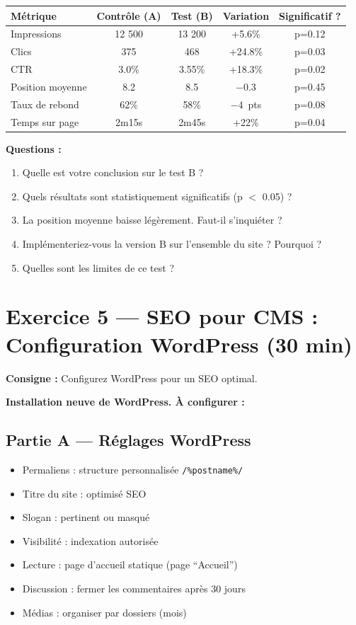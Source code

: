 \documentclass[12pt,a4paper]{report}
\begin{document}
\begin{longtable}{|l|c|c|c|c|}
\hline
\textbf{Métrique} & \textbf{Contrôle (A)} & \textbf{Test (B)} & \textbf{Variation} & \textbf{Significatif ?} \\
\hline
Impressions & 12 500 & 13 200 & +5.6\% & p=0.12 \\
\hline
Clics & 375 & 468 & +24.8\% & p=0.03 \\
\hline
CTR & 3.0\% & 3.55\% & +18.3\% & p=0.02 \\
\hline
Position moyenne & 8.2 & 8.5 & $-0.3$ & p=0.45 \\
\hline
Taux de rebond & 62\% & 58\% & $-4$~pts & p=0.08 \\
\hline
Temps sur page & 2m15s & 2m45s & +22\% & p=0.04 \\
\hline
\end{longtable}

\textbf{Questions :}
\begin{enumerate}
\item Quelle est votre conclusion sur le test B ?
\item Quels résultats sont statistiquement significatifs (p $<$ 0.05) ?
\item La position moyenne baisse légèrement. Faut-il s'inquiéter ?
\item Implémenteriez-vous la version B sur l'ensemble du site ? Pourquoi ?
\item Quelles sont les limites de ce test ?
\end{enumerate}

\section{Exercice 5 --- SEO pour CMS : Configuration WordPress (30 min)}

\textbf{Consigne :} Configurez WordPress pour un SEO optimal.

\textbf{Installation neuve de WordPress. À configurer :}

\subsection{Partie A --- Réglages WordPress}
\begin{itemize}
\item[$\square$] Permaliens : structure personnalisée \texttt{/\%postname\%/}
\item[$\square$] Titre du site : optimisé SEO
\item[$\square$] Slogan : pertinent ou masqué
\item[$\square$] Visibilité : indexation autorisée
\item[$\square$] Lecture : page d'accueil statique (page ``Accueil'')
\item[$\square$] Discussion : fermer les commentaires après 30 jours
\item[$\square$] Médias : organiser par dossiers (mois)
\end{itemize}
\end{document}
